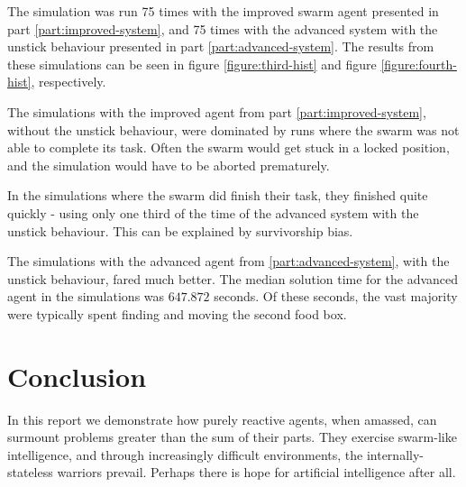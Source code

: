 \documentclass[a4paper]{article}
\begin{document}
The simulation was run 75 times with the improved swarm agent presented in part \vref{part:improved-system}, and 75 times with the advanced system with the unstick behaviour presented in part \vref{part:advanced-system}.
The results from these simulations can be seen in figure \vref{figure:third-hist} and figure \vref{figure:fourth-hist}, respectively.

The simulations with the improved agent from part \ref{part:improved-system}, without the unstick behaviour, were dominated by runs where the swarm was not able to complete its task.
Often the swarm would get stuck in a locked position, and the simulation would have to be aborted prematurely.

In the simulations where the swarm did finish their task, they finished quite quickly - using only one third of the time of the advanced system with the unstick behaviour.
This can be explained by survivorship bias.

The simulations with the advanced agent from \ref{part:advanced-system}, with the unstick behaviour, fared much better.
The median solution time for the advanced agent in the simulations was $ 647.872 $ seconds.
Of these seconds, the vast majority were typically spent finding and moving the second food box.



\section{Conclusion}
In this report we demonstrate how purely reactive agents, when amassed, can surmount problems greater than the sum of their parts. They exercise swarm-like intelligence, and through increasingly difficult environments, the internally-stateless warriors prevail. Perhaps there is hope for artificial intelligence after all.

\newpage
{}


\end{document}
